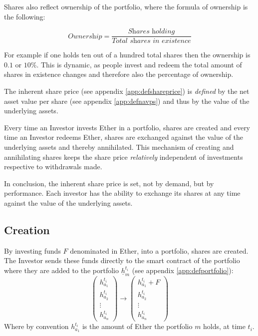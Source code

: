 \documentclass[9pt,oneside]{amsart}
\theoremstyle{plain}
\begin{document}
\begin{multicols}{2}
Shares also reflect ownership of the portfolio, where the formula of ownership is the following:

\begin{equation}
	\textit{Ownership} = \frac{\textit{Shares holding}}{\textit{Total shares in existence}}
\end{equation}

For example if one holds ten out of a hundred total shares then the ownership is $0.1$ or $10\%$. This is dynamic, as people invest and redeem the total amount of shares in existence changes and therefore also the percentage of ownership. 

The inherent share price (see appendix \ref{app:defshareprice}) is \textit{defined} by the net asset value per share (see appendix \ref{app:defnavps}) and thus by the value of the underlying assets.

Every time an Investor invests Ether in a portfolio, shares are created and every time an Investor redeems Ether, shares are exchanged against the value of the underlying assets and thereby annihilated. This mechanism of creating and annihilating shares keeps the share price \textit{relatively} independent of investments respective to withdrawals made.

In conclusion, the inherent share price is set, not by demand, but by performance. Each investor has the ability to exchange its shares at any time against the value of the underlying assets. 

\subsection{Creation}\label{sub:creation}

By investing funds $F$ denominated in Ether, into a portfolio, shares are created. The Investor sends these funds directly to the smart contract of the portfolio where they are added to the portfolio $\underline{h}_m^{t_i}$ (see appendix \ref{app:defportfolio}):
\begin{equation*}
	\begin{pmatrix}
		h_{a_{1}}^{t_i}\\
		h_{a_{2}}^{t_i}\\
		\vdots \\
		h_{a_{n}}^{t_i}
	\end{pmatrix}
	\rightarrow
	\begin{pmatrix}
		h_{a_{1}}^{t_i} + F\\
		h_{a_{2}}^{t_i}\\
		\vdots \\
		h_{a_{n}}^{t_i}
	\end{pmatrix}
\end{equation*}
Where by convention $h_{a_{1}}^{t_i}$ is the amount of Ether the portfolio $m$ holds, at time $t_i$.


\end{multicols}
\end{document}
